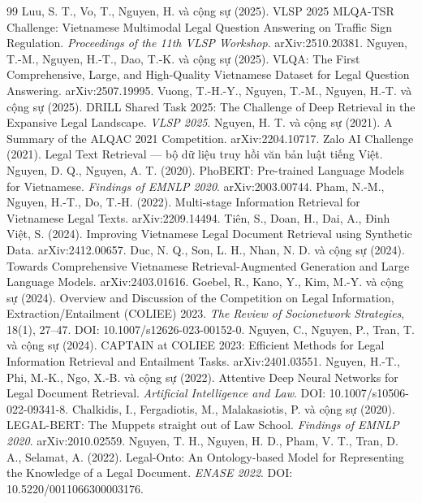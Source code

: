 {\begin{thebibliography}{99}
 Luu, S. T., Vo, T., Nguyen, H. và cộng sự (2025). VLSP 2025 MLQA-TSR Challenge: Vietnamese Multimodal Legal Question Answering on Traffic Sign Regulation. \emph{Proceedings of the 11th VLSP Workshop}. arXiv:2510.20381.
 Nguyen, T.-M., Nguyen, H.-T., Dao, T.-K. và cộng sự (2025). VLQA: The First Comprehensive, Large, and High-Quality Vietnamese Dataset for Legal Question Answering. arXiv:2507.19995.
 Vuong, T.-H.-Y., Nguyen, T.-M., Nguyen, H.-T. và cộng sự (2025). DRILL Shared Task 2025: The Challenge of Deep Retrieval in the Expansive Legal Landscape. \emph{VLSP 2025}.
 Nguyen, H. T. và cộng sự (2021). A Summary of the ALQAC 2021 Competition. arXiv:2204.10717.
 Zalo AI Challenge (2021). Legal Text Retrieval --- bộ dữ liệu truy hồi văn bản luật tiếng Việt.
 Nguyen, D. Q., Nguyen, A. T. (2020). PhoBERT: Pre-trained Language Models for Vietnamese. \emph{Findings of EMNLP 2020}. arXiv:2003.00744.
 Pham, N.-M., Nguyen, H.-T., Do, T.-H. (2022). Multi-stage Information Retrieval for Vietnamese Legal Texts. arXiv:2209.14494.
 Tiên, S., Doan, H., Dai, A., Đinh Việt, S. (2024). Improving Vietnamese Legal Document Retrieval using Synthetic Data. arXiv:2412.00657.
 Duc, N. Q., Son, L. H., Nhan, N. D. và cộng sự (2024). Towards Comprehensive Vietnamese Retrieval-Augmented Generation and Large Language Models. arXiv:2403.01616.
 Goebel, R., Kano, Y., Kim, M.-Y. và cộng sự (2024). Overview and Discussion of the Competition on Legal Information, Extraction/Entailment (COLIEE) 2023. \emph{The Review of Socionetwork Strategies}, 18(1), 27--47. DOI: 10.1007/s12626-023-00152-0.
 Nguyen, C., Nguyen, P., Tran, T. và cộng sự (2024). CAPTAIN at COLIEE 2023: Efficient Methods for Legal Information Retrieval and Entailment Tasks. arXiv:2401.03551.
 Nguyen, H.-T., Phi, M.-K., Ngo, X.-B. và cộng sự (2022). Attentive Deep Neural Networks for Legal Document Retrieval. \emph{Artificial Intelligence and Law}. DOI: 10.1007/s10506-022-09341-8.
 Chalkidis, I., Fergadiotis, M., Malakasiotis, P. và cộng sự (2020). LEGAL-BERT: The Muppets straight out of Law School. \emph{Findings of EMNLP 2020}. arXiv:2010.02559.
 Nguyen, T. H., Nguyen, H. D., Pham, V. T., Tran, D. A., Selamat, A. (2022). Legal-Onto: An Ontology-based Model for Representing the Knowledge of a Legal Document. \emph{ENASE 2022}. DOI: 10.5220/0011066300003176.

\end{thebibliography}}
